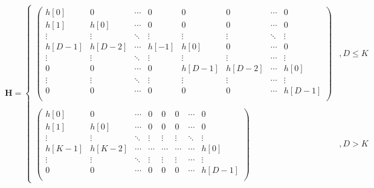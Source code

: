 \documentclass[x11names,a4paper,12pt]{article}
\begin{document}
\begin{equation}
  \mathbf{H}=
  \begin{cases}
    \begin{pmatrix}
      h[0]                 & 0                    & \cdots & 0      & 0                     & 0                    & \cdots & 0                   \\
      h[1]                 & h[0]                 & \cdots & 0      & 0                     & 0                    & \cdots & 0                   \\
      \vdots               & \vdots               & \ddots & \vdots & \vdots                & \vdots               & \ddots & \vdots              \\
      \scriptstyle{h[D-1]} & \scriptstyle{h[D-2]} & \cdots & h[-1]  & h[0]                  & 0                    & \cdots & 0                   \\
      \vdots               & \vdots               & \ddots & \vdots & \vdots                & \vdots               & \cdots & \vdots              \\
      0                    & 0                    & \cdots & 0      & \scriptstyle{h[D-1]}  & \scriptstyle{h[D-2]} & \cdots & h[0]                \\
      \vdots               & \vdots               & \ddots & \vdots & \vdots                & \vdots               & \cdots & \vdots              \\
      0                    & 0                    & \cdots & 0      & 0                     & 0                    & \cdots & \scriptstyle{h[D-1]}\\
    \end{pmatrix} &, D\leq K \\
    \\
    \begin{pmatrix}
      h[0]                 & 0                    & \cdots & 0      & 0                     & 0                    & \cdots & 0                   \\
      h[1]                 & h[0]                 & \cdots & 0      & 0                     & 0                    & \cdots & 0                   \\
      \vdots               & \vdots               & \ddots & \vdots & \vdots                & \vdots               & \ddots & \vdots              \\
      \scriptstyle{h[K-1]} & \scriptstyle{h[K-2]} & \cdots & \cdots & \cdots                & \cdots               & \cdots & h[0]                \\
      \vdots               & \vdots               & \ddots & \vdots & \vdots                & \vdots               & \cdots & \vdots              \\
      0                    & 0                    & \cdots & 0      & 0                     & 0                    & \cdots & \scriptstyle{h[D-1]}\\
    \end{pmatrix} &, D>K
  \end{cases}
\end{equation}
\end{document}
